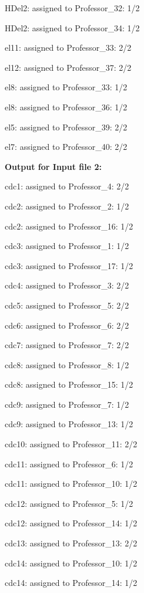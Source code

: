 \documentclass{article} %
\begin{document}
\noindent HDel2: assigned to Professor\_32: 1/2

\noindent HDel2: assigned to Professor\_34: 1/2

\noindent el11: assigned to Professor\_33: 2/2

\noindent el12: assigned to Professor\_37: 2/2

\noindent el8: assigned to Professor\_33: 1/2

\noindent el8: assigned to Professor\_36: 1/2

\noindent el5: assigned to Professor\_39: 2/2

\noindent el7: assigned to Professor\_40: 2/2

\noindent \textbf{Output for Input file 2:}

\noindent cdc1: assigned to Professor\_4: 2/2

\noindent cdc2: assigned to Professor\_2: 1/2

\noindent cdc2: assigned to Professor\_16: 1/2

\noindent cdc3: assigned to Professor\_1: 1/2

\noindent cdc3: assigned to Professor\_17: 1/2

\noindent cdc4: assigned to Professor\_3: 2/2

\noindent cdc5: assigned to Professor\_5: 2/2

\noindent cdc6: assigned to Professor\_6: 2/2

\noindent cdc7: assigned to Professor\_7: 2/2

\noindent cdc8: assigned to Professor\_8: 1/2

\noindent cdc8: assigned to Professor\_15: 1/2

\noindent cdc9: assigned to Professor\_7: 1/2

\noindent cdc9: assigned to Professor\_13: 1/2

\noindent cdc10: assigned to Professor\_11: 2/2

\noindent cdc11: assigned to Professor\_6: 1/2

\noindent cdc11: assigned to Professor\_10: 1/2

\noindent cdc12: assigned to Professor\_5: 1/2

\noindent cdc12: assigned to Professor\_14: 1/2

\noindent cdc13: assigned to Professor\_13: 2/2

\noindent cdc14: assigned to Professor\_10: 1/2

\noindent cdc14: assigned to Professor\_14: 1/2
\end{document}

